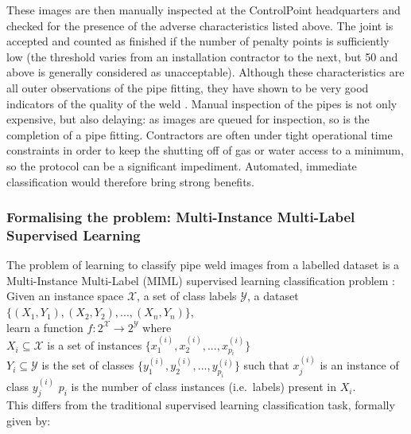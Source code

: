 \documentclass[a4paper,11pt]{article}
\begin{document}
These images are then manually inspected at the ControlPoint headquarters and checked for the presence of the adverse characteristics listed above. The joint is accepted and counted as finished if the number of penalty points is sufficiently low (the threshold varies from an installation contractor to the next, but 50 and above is generally considered as unacceptable). Although these characteristics are all outer observations of the pipe fitting, they have shown to be very good indicators of the quality of the weld \cite{control-point}. Manual inspection of the pipes is not only expensive, but also delaying: as images are queued for inspection, so is the completion of a pipe fitting. Contractors are often under tight operational time constraints in order to keep the shutting off of gas or water access to a minimum, so the protocol can be a significant impediment. Automated, immediate classification would therefore bring strong benefits.

\subsubsection{Formalising the problem: Multi-Instance Multi-Label Supervised Learning}

The problem of learning to classify pipe weld images from a labelled dataset is a Multi-Instance Multi-Label (MIML) supervised learning classification problem \cite{MIML}: \\

\indent Given an instance space $\mathcal{X}$, a set of class labels $\mathcal{Y}$, a dataset $\{(X_{1},Y_{1}),(X_{2},Y_{2}), ..., (X_{n},Y_{n})\}$,\\ 
\indent learn a function $f : 2^{\mathcal{X}} \rightarrow 2^{\mathcal{Y}}$ where\\  
\indent \indent $X_{i} \subseteq \mathcal{X}$ is a set of instances $\{x_{1}^{(i)}, x_{2}^{(i)}, ..., x_{p_{i}}^{(i)}\}$\\   
\indent \indent $Y_{	i} \subseteq \mathcal{Y}$ is the set of classes $\{y_{1}^{(i)}, y_{2}^{(i)}, ..., y_{p_{i}}^{(i)}\}$ such that $x_{j}^{(i)}$ is an instance of class $y_{j}^{(i)}$ 
\indent \indent $p_{i}$ is the number of class instances (i.e.\ labels) present in $X_{i}$.\\


This differs from the traditional supervised learning classification task, formally given by: \\ 
\end{document}
